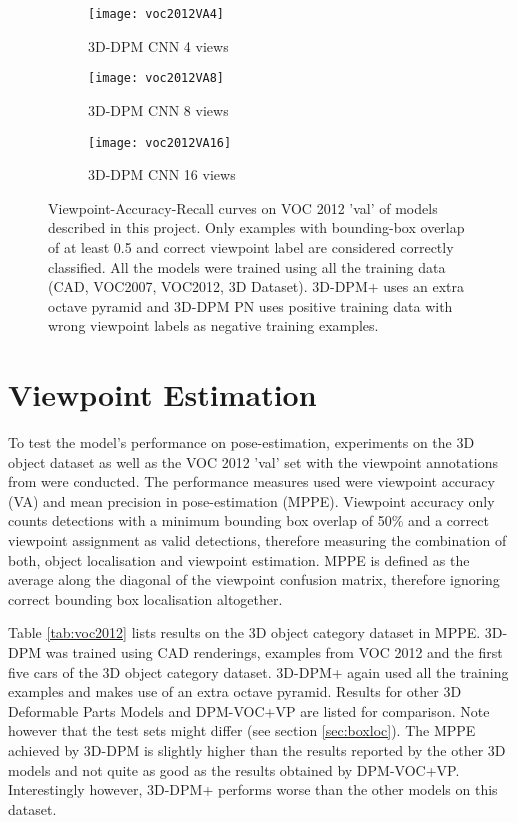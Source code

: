 \begin{figure}
\begin{center}
        \begin{subfigure}[b]{0.49\textwidth}
                \texttt{[image: voc2012VA4]}
               	\caption{3D-DPM CNN 4 views}
        \end{subfigure}
        \begin{subfigure}[b]{0.49\textwidth}
                \texttt{[image: voc2012VA8]}
               	\caption{3D-DPM CNN 8 views}
        \end{subfigure}
        \begin{subfigure}[b]{0.49\textwidth}
                \texttt{[image: voc2012VA16]}
               	\caption{3D-DPM CNN 16 views}
        \end{subfigure}        
    \caption{Viewpoint-Accuracy-Recall curves on VOC 2012 'val' of models described in this project. Only examples with bounding-box overlap of at least 0.5 and correct viewpoint label are considered correctly classified. All the models were trained using all the training data (CAD, VOC2007, VOC2012, 3D Dataset). 3D-DPM+ uses an extra octave pyramid and 3D-DPM PN uses positive training data with wrong viewpoint labels as negative training examples.}
\label{fig:AVVOC2012}
\end{center}
\end{figure}

\section{Viewpoint Estimation}

To test the model's performance on pose-estimation, experiments on the 3D object dataset as well as the VOC 2012 'val' set with the viewpoint annotations from \cite{xiang_wacv14} were conducted. The performance measures used were viewpoint accuracy (VA) and mean precision in pose-estimation (MPPE). Viewpoint accuracy only counts detections with a minimum bounding box overlap of 50\% and a correct viewpoint assignment as valid detections, therefore measuring the combination of both, object localisation and viewpoint estimation. MPPE is defined as the average along the diagonal of the viewpoint confusion matrix, therefore ignoring correct bounding box localisation altogether. 

Table \ref{tab:voc2012} lists results on the 3D object category dataset in MPPE. 3D-DPM was trained using CAD renderings, examples from VOC 2012 and the first five cars of the 3D object category dataset. 3D-DPM+ again used all the training examples and makes use of an extra octave pyramid. Results for other 3D Deformable Parts Models  \cite{6248075} \cite{Pepik:2012aa} and DPM-VOC+VP \cite{6248075} are listed for comparison. Note however that the test sets might differ (see section  \ref{sec:boxloc}). The MPPE achieved by 3D-DPM is slightly higher than the results reported by the other 3D models and not quite as good as the results obtained by DPM-VOC+VP. Interestingly however, 3D-DPM+ performs worse than the other models on this dataset. 


